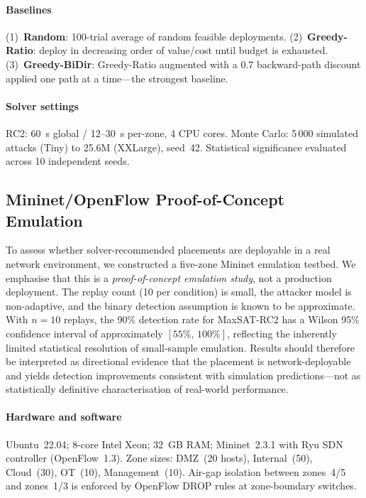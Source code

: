 \documentclass[journal]{IEEEtran}
\begin{document}
\paragraph{Baselines}
(1)~\textbf{Random}: 100-trial average of random feasible deployments.
(2)~\textbf{Greedy-Ratio}: deploy in decreasing order of value/cost
until budget is exhausted.
(3)~\textbf{Greedy-BiDir}: Greedy-Ratio augmented with a $0.7$
backward-path discount applied one path at a time---the strongest
baseline.

\paragraph{Solver settings}
RC2: 60~s global / 12--30~s per-zone, 4 CPU cores. Monte Carlo:
5\,000 simulated attacks (Tiny) to 25.6M (XXLarge), seed~42.
Statistical significance evaluated across 10 independent seeds.

\subsection{Mininet/OpenFlow Proof-of-Concept Emulation}
\label{sec:emulation}

To assess whether solver-recommended placements are deployable in a
real network environment, we constructed a five-zone Mininet emulation
testbed. We emphasise that this is a \emph{proof-of-concept emulation
study}, not a production deployment. The replay count (10 per
condition) is small, the attacker model is non-adaptive, and the
binary detection assumption is known to be approximate. With $n=10$
replays, the 90\% detection rate for MaxSAT-RC2 has a Wilson 95\%
confidence interval of approximately $[55\%,\,100\%]$, reflecting the
inherently limited statistical resolution of small-sample emulation.
Results should therefore be interpreted as directional evidence that
the placement is network-deployable and yields detection improvements
consistent with simulation predictions---not as statistically
definitive characterisation of real-world performance.

\paragraph{Hardware and software}
Ubuntu~22.04; 8-core Intel Xeon; 32~GB RAM; Mininet~2.3.1 with Ryu
SDN controller (OpenFlow~1.3). Zone sizes: DMZ~(20 hosts),
Internal~(50), Cloud~(30), OT~(10), Management~(10). Air-gap
isolation between zones~4/5 and zones~1/3 is enforced by OpenFlow
DROP rules at zone-boundary switches.
\end{document}
